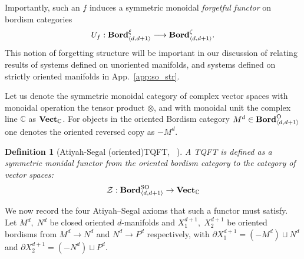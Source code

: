 \documentclass[aps,prx,reprint,superscriptaddress,twocolumn,amsmath,amssymb,amsfonts, nofootinbib]{revtex4-2}
\newcommand{\SO}{\text{SO}}
\newcommand{\bordd}{{\bf Bord}_{\langle d, d+1\rangle}}
\newcommand{\vect}{{\bf Vect}_{\mathbb{C}}}
\theoremstyle{apsstyle}
\newtheorem{definition}[theorem]{Definition}
\begin{document}
\bigskip 

\noindent Importantly, such an $f$ induces a symmetric monoidal \emph{forgetful functor} on bordism categories
\begin{equation}
\label{eq:forgetful_bord_functor}
    U_f:\bordd^{\xi}\longrightarrow
    \bordd^{\zeta}.
\end{equation}
\noindent This notion of forgetting structure will be important in our discussion of relating results of systems defined on unoriented manifolds, and systems defined on strictly oriented manifolds in App.~\ref{app:so_str}.


\bigskip 

\noindent Let us denote the symmetric monoidal category of complex vector spaces with monoidal operation the tensor product $\otimes$, and with monoidal unit the complex line $\mathbb{C}$ as $\vect$. 
For objects in the oriented Bordism category $M^{d}\in \bordd^{\mathrm{O}}$ one denotes the oriented reversed copy as $-M^{d}$.

\bigskip

\begin{definition}[Atiyah-Segal (oriented)TQFT, ~\cite{Atiyah1988}]
\label{def:AtiyahSegal}
A TQFT is defined as a symmetric monidal functor from the oriented bordism category to the category of vector spaces:
\begin{equation*}
    \mathcal{Z}:  \bordd^{\SO} \to \vect
\end{equation*}
\end{definition}

\noindent We now record the four Atiyah–Segal axioms that such a functor must satisfy.  Let $M^{d},\;N^{d}$ be closed oriented $d$-manifolds and $X_1^{d+1},\; X_2^{d+1}$ be oriented bordisms from $M^{d}\to N^{d}$ and $N^{d}\to P^{d}$ respectively, with $\partial X_1^{d+1}= (-M^{d})\sqcup N^{d}$ and $\partial X_2^{d+1}=(-N^{d})\sqcup P^{d}$.
\end{document}
